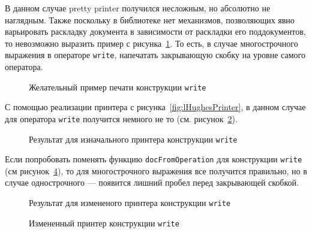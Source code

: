 В данном случае pretty printer получился несложным, но абсолютно не наглядным. Также поскольку в библиотеке нет механизмов, позволяющих явно варьировать раскладку документа в зависимости от раскладки его поддокументов, то невозможно выразить пример с рисунка~\ref{fig:lGoodWriteEx}.
То есть, в случае многострочного выражения в операторе \lstinline[language=llang]{write}, напечатать закрывающую скобку на уровне самого оператора.

\begin{figure}[h!]
	
	\caption{Желательный пример печати конструкции \lstinline[language=llang]{write}}
	\label{fig:lGoodWriteEx}
\end{figure}

С помощью реализации принтера с рисунка~\ref{fig:lHughesPrinter}, в данном случае для оператора \lstinline[language=llang]{write} получится немного не то (см. рисунок~\ref{fig:lCurWriteEx}).
\begin{figure}[h!]
	
	\caption{Результат для изначального принтера конструкции \lstinline[language=llang]{write}}
	\label{fig:lCurWriteEx}
\end{figure}

Если попробовать поменять функцию \lstinline[language=Haskell]{docFromOperation} для конструкции \lstinline[language=llang]{write} (см рисунок~\ref{fig:lHughesWriteChange}),
то для многострочного выражения все получится правильно, но в случае однострочного --- появится лишний пробел перед закрывающей скобкой.

\begin{figure}[h!]
	
	\caption{Результат для измененого принтера конструкции \lstinline[language=llang]{write}}
	\label{fig:lBadWriteEx}
\end{figure}

\begin{figure}[h!]
	
	\caption{Измененный принтер конструкции \lstinline[language=llang]{write}}
	\label{fig:lHughesWriteChange}
\end{figure}